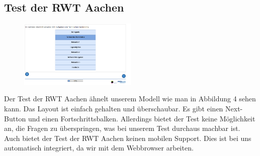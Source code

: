 \subsection{Test der RWT Aachen}
\begin{figure}[htbp] 
  \centering
     \includegraphics[width=0.5\textwidth]{Jonas_Images/abschnitte.png}
  \caption{}
  \label{fig:Bild4}
\end{figure}
Der Test der RWT Aachen ähnelt unserem Modell wie man in Abbildung 4 sehen kann\cite{Aachen}. Das Layout ist einfach gehalten und überschaubar. Es gibt einen Next-Button und einen Fortschrittsbalken. Allerdings bietet der Test keine Möglichkeit an, die Fragen zu überspringen, was bei unserem Test durchaus machbar ist. Auch bietet der Test der RWT Aachen keinen mobilen Support. Dies ist bei uns automatisch integriert, da wir mit dem Webbrowser arbeiten.